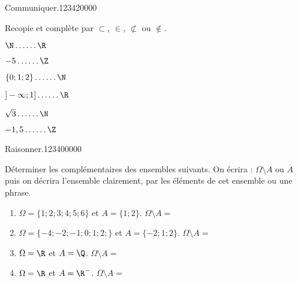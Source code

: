 \begin{pageAD} 
 

 
  
\begin{ExoCad}{Communiquer.}{1234}{2}{0}{0}{0}{0}

Recopie et complète par $\subset$, $\in$, $\not\subset$ ou $\notin$.

\begin{enumerate}
\begin{minipage}{0.32\linewidth}
\item $\N \ldots \ldots \R$
\item $-5 \ldots \ldots \Z$
\end{minipage}
\hfill
\begin{minipage}{0.32\linewidth}
\item $\left\lbrace 0;1;2 \right\rbrace \ldots \ldots \N$
\item $]-\infty;1] \ldots \ldots \R$
\end{minipage}
\hfill
\begin{minipage}{0.32\linewidth}
\item $\sqrt{3} \ldots \ldots \N$
\item $-1,5 \ldots \ldots \Z$
\end{minipage}
\end{enumerate}
 
\end{ExoCad}

\begin{ExoCad}{Raisonner.}{1234}{0}{0}{0}{0}{0}

Déterminer les complémentaires des ensembles suivants. On écrira : $\Omega \setminus A$ ou $\overline{A}$ puis on décrira l'ensemble clairement, par les éléments de cet ensemble ou une phrase.
\begin{enumerate}
\item $\Omega = \lbrace 1;2;3;4;5;6\rbrace$ et $A = \lbrace 1;2 \rbrace$. $\Omega \setminus A = $
\item $\Omega = \lbrace -4;-2;-1;0;1;2;\rbrace$ et $A = \lbrace -2;1;2 \rbrace$.  $\Omega \setminus A = $
\item $\Omega = \R$ et $A = \Q$. $\Omega \setminus A = $
\item $\Omega = \R$ et $A = \R^-$. $\Omega \setminus A = $
\end{enumerate} 
 \end{ExoCad}




\end{pageAD}
